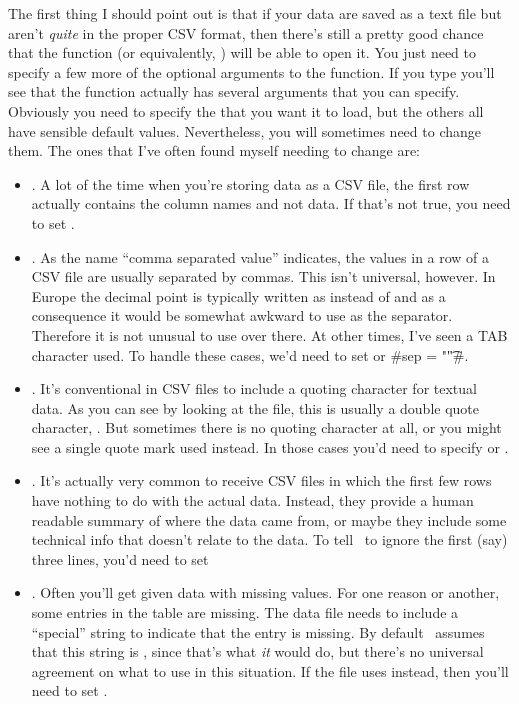 The first thing I should point out is that if your data are saved as a text file but aren't {\it quite} in the proper CSV format, then there's still a pretty good chance that the  function (or equivalently, ) will be able to open it. You just need to specify a few more of the optional arguments to the function. If you type  you'll see that the  function actually has several arguments that you can specify. Obviously you need to specify the  that you want it to load, but the others all have sensible default values. Nevertheless, you will sometimes need to change them. The ones that I've often found myself needing to change are:
\begin{itemize}
\item {}. A lot of the time when you're storing data as a CSV file, the first row actually contains the column names and not data. If that's not true, you need to set . 
\item {}. As the name ``comma separated value'' indicates, the values in a row of a CSV file are usually separated by commas. This isn't universal, however. In Europe the decimal point is typically written as \rtext{,} instead of  and as a consequence it would be somewhat awkward to use \rtext{,} as the separator. Therefore it is not unusual to use \rtext{;} over there. At other times, I've seen a TAB character used. To handle these cases, we'd need to set  or \rtextverb#sep = "\t"#.  
\item {}. It's conventional in CSV files to include a quoting character for textual data. As you can see by looking at the  file, this is usually a double quote character, . But sometimes there is no quoting character at all, or you might see a single quote mark  used instead. In those cases you'd need to specify  or . 
\item {}. It's actually very common to receive CSV files in which the first few rows have nothing to do with the actual data. Instead, they provide a human readable summary of where the data came from, or maybe they include some technical info that doesn't relate to the data. To tell \R\ to ignore the first (say) three lines, you'd need to set 
\item {}. Often you'll get given data with missing values. For one reason or another, some entries in the table are missing. The data file needs to include a ``special'' string to indicate that the entry is missing. By default \R\ assumes that this string is , since that's what {\it it} would do, but there's no universal agreement on what to use in this situation. If the file uses  instead, then you'll need to set . 
\end{itemize}
